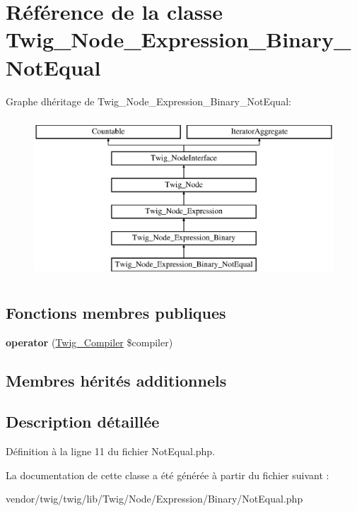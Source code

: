 \hypertarget{class_twig___node___expression___binary___not_equal}{}\section{Référence de la classe Twig\+\_\+\+Node\+\_\+\+Expression\+\_\+\+Binary\+\_\+\+Not\+Equal}
\label{class_twig___node___expression___binary___not_equal}
Graphe d\textquotesingle{}héritage de Twig\+\_\+\+Node\+\_\+\+Expression\+\_\+\+Binary\+\_\+\+Not\+Equal\+:\begin{figure}[H]
\begin{center}
\leavevmode
\includegraphics[height=6.000000cm]{class_twig___node___expression___binary___not_equal}
\end{center}
\end{figure}
\subsection*{Fonctions membres publiques}
\begin{DoxyCompactItemize}
\item 
{\bfseries operator} (\hyperlink{class_twig___compiler}{Twig\+\_\+\+Compiler} \$compiler)\hypertarget{class_twig___node___expression___binary___not_equal_af77318ec88d5f8a508684970a150b670}{}\label{class_twig___node___expression___binary___not_equal_af77318ec88d5f8a508684970a150b670}

\end{DoxyCompactItemize}
\subsection*{Membres hérités additionnels}


\subsection{Description détaillée}


Définition à la ligne 11 du fichier Not\+Equal.\+php.



La documentation de cette classe a été générée à partir du fichier suivant \+:\begin{DoxyCompactItemize}
\item 
vendor/twig/twig/lib/\+Twig/\+Node/\+Expression/\+Binary/Not\+Equal.\+php\end{DoxyCompactItemize}
